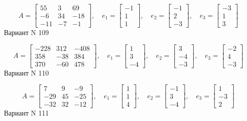 \documentclass[11pt]{report}
\begin{document}
$$A = \left[\begin{matrix}55 & 3 & 69\\-6 & 34 & -18\\-11 & -7 & -1\end{matrix}\right],\quad e_1 = \left[\begin{matrix}-1\\1\\1\end{matrix}\right],\quad e_2 = \left[\begin{matrix}-1\\2\\-3\end{matrix}\right],\quad e_3 = \left[\begin{matrix}-3\\1\\3\end{matrix}\right]$$Вариант N 109

$$A = \left[\begin{matrix}-228 & 312 & -408\\358 & -38 & 384\\370 & -60 & 478\end{matrix}\right],\quad e_1 = \left[\begin{matrix}1\\3\\-4\end{matrix}\right],\quad e_2 = \left[\begin{matrix}3\\-4\\-3\end{matrix}\right],\quad e_3 = \left[\begin{matrix}-2\\4\\-3\end{matrix}\right]$$Вариант N 110

$$A = \left[\begin{matrix}7 & 9 & -9\\-29 & 45 & -25\\-32 & 32 & -12\end{matrix}\right],\quad e_1 = \left[\begin{matrix}1\\1\\4\end{matrix}\right],\quad e_2 = \left[\begin{matrix}-1\\3\\-4\end{matrix}\right],\quad e_3 = \left[\begin{matrix}1\\-3\\2\end{matrix}\right]$$Вариант N 111
\end{document}
